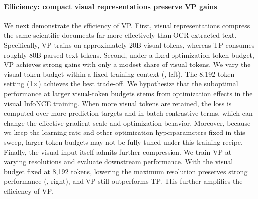 \paragraph{Efficiency: compact visual representations preserve VP gains}

We next demonstrate the efficiency of VP.
First, visual representations compress the same scientific documents far more effectively than OCR-extracted text.
Specifically, VP trains on approximately 20B visual tokens, whereas TP consumes roughly 80B parsed text tokens.
Second, under a fixed optimization token budget, VP achieves strong gains with only a modest share of visual tokens.
We vary the visual token budget within a fixed training context (, left). 
The 8,192-token setting (1$\times$) achieves the best trade-off.
We hypothesize that the suboptimal performance at larger visual-token budgets stems from optimization effects in the visual InfoNCE training. 
When more visual tokens are retained, the loss is computed over more prediction targets and in-batch contrastive terms, which can change the effective gradient scale and optimization behavior.
Moreover, because we keep the learning rate and other optimization hyperparameters fixed in this sweep, larger token budgets may not be fully tuned under this training recipe.
Finally, the visual input itself admits further compression. 
We train VP at varying resolutions and evaluate downstream performance.
With the visual budget fixed at 8,192 tokens, 
lowering the maximum resolution preserves strong performance (, right), and VP still outperforms TP.
This further amplifies the efficiency of VP.



